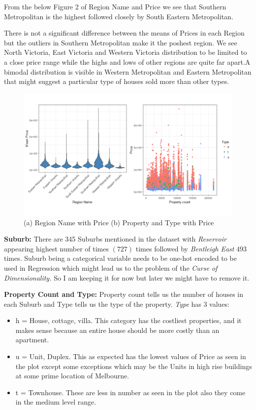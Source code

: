 \documentclass[]{article}
\providecommand{\tightlist}{%
  \setlength{\itemsep}{0pt}\setlength{\parskip}{0pt}}
\begin{document}
From the below Figure 2 of Region Name and Price we see that Southern
Metropolitan is the highest followed closely by South Eastern
Metropolitan.

There is not a significant difference between the means of Prices in
each Region but the outliers in Southern Metropolitan make it the
poshest region. We see North Victoria, East Victoria and Western
Victoria distribution to be limited to a close price range while the
highs and lows of other regions are quite far apart.A bimodal
distribution is visible in Western Metropolitan and Eastern Metropolitan
that might suggest a particular type of houses sold more than other
types.

\begin{figure}
\centering
\includegraphics{Report_files/figure-latex/unnamed-chunk-3-1.pdf}
\caption{(a) Region Name with Price (b) Property and Type with Price}
\end{figure}

\textbf{Suburb:} There are 345 Suburbs mentioned in the dataset with
\emph{Reservoir} appearing highest number of times \((727)\) times
followed by \emph{Bentleigh East} \(493\) times. Suburb being a
categorical variable needs to be one-hot encoded to be used in
Regression which might lead us to the problem of the \emph{Curse of
Dimensionality.} So I am keeping it for now but later we might have to
remove it.

\textbf{Property Count and Type:} Property count tells us the number of
houses in each Suburb and Type tells us the type of the property.
\emph{Type} has 3 values:

\begin{itemize}
\tightlist
\item
  h = House, cottage, villa. This category has the costliest properties,
  and it makes sense because an entire house should be more costly than
  an apartment.
\item
  u = Unit, Duplex. This as expected has the lowest values of Price as
  seen in the plot except some exceptions which may be the Units in high
  rise buildings at some prime location of Melbourne.
\item
  t = Townhouse. These are less in number as seen in the plot also they
  come in the medium level range.
\end{itemize}
\end{document}

